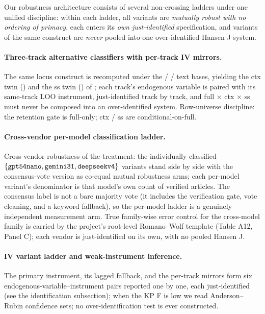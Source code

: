 Our robustness architecture consists of several non-crossing ladders under one unified
discipline: within each ladder, all variants are \emph{mutually robust with no ordering
of primacy}, each enters its \emph{own just-identified} specification, and variants of
the same construct are \emph{never} pooled into one over-identified Hansen J system.

\paragraph{Three-track alternative classifiers with per-track IV mirrors.}
The same locus construct is recomputed under the  /  / 
text bases, yielding the ctx twin () and the ss twin
() of ; each track's endogenous variable is paired
with its same-track LOO instrument, just-identified track by track, and full $\times$
ctx $\times$ ss must never be composed into an over-identified system. Row-universe
discipline: the retention gate is full-only; ctx / ss are conditional-on-full.

\paragraph{Cross-vendor per-model classification ladder.}
Cross-vendor robustness of the treatment: the individually classified
$\{\texttt{gpt54nano},\texttt{gemini31},\texttt{deepseekv4}\}$
variants stand side by side with the consensus-vote version as co-equal mutual
robustness arms; each per-model variant's denominator is that model's own count of
verified articles. The consensus label is not a bare majority vote (it includes the
verification gate, vote cleaning, and a keyword fallback), so the per-model ladder is a
genuinely independent measurement arm. True family-wise error control for the
cross-model family is carried by the project's root-level Romano--Wolf template
(Table A12, Panel C); each vendor is just-identified on its own, with no pooled Hansen J.

\paragraph{IV variant ladder and weak-instrument inference.}
The primary instrument, its lagged fallback, and the per-track mirrors form six
endogenous-variable--instrument pairs reported one by one, each just-identified (see
the identification subsection); when the KP F is low we read Anderson--Rubin confidence
sets; no over-identification test is ever constructed.


